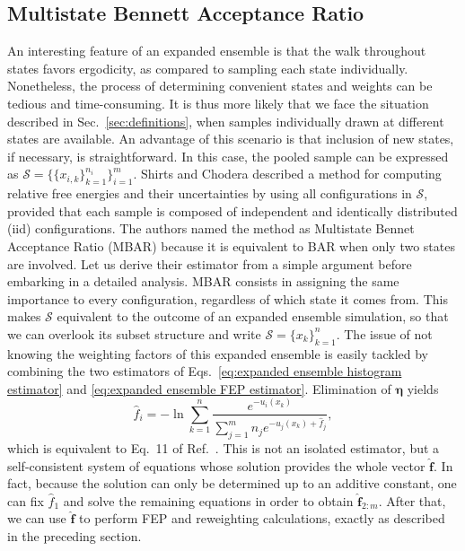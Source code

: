 \documentclass[aip,jcp,reprint,amsmath,amssymb]{revtex4-1}
\newcommand{\vt}[1]{\boldsymbol{\mathbf{#1}}}           %
\begin{document}
\subsection{Multistate Bennett Acceptance Ratio}

An interesting feature of an expanded ensemble is that the walk throughout states favors ergodicity, as compared to sampling each state individually. Nonetheless, the process of determining convenient states and weights can be tedious and time-consuming. It is thus more likely that we face the situation described in Sec.~\ref{sec:definitions}, when samples individually drawn at different states are available. An advantage of this scenario is that inclusion of new states, if necessary, is straightforward. In this case, the pooled sample can be expressed as $\mathcal S = \big\{\{x_{i,k}\}_{k=1}^{n_i} \big\}_{i=1}^m$. Shirts and Chodera\cite{Shirts_2008} described a method for computing relative free energies and their uncertainties by using all configurations in $\mathcal S$, provided that each sample is composed of independent and identically distributed (iid) configurations. The authors named the method as Multistate Bennet Acceptance Ratio (MBAR) because it is equivalent to BAR when only two states are involved. Let us derive their estimator from a simple argument before embarking in a detailed analysis. MBAR consists in assigning the same importance to every configuration, regardless of which state it comes from. This makes $\mathcal S$ equivalent to the outcome of an expanded ensemble simulation, so that we can overlook its subset structure and write $\mathcal S = \{x_k\}_{k=1}^n$. The issue of not knowing the weighting factors of this expanded ensemble is easily tackled by combining the two estimators of Eqs.~\eqref{eq:expanded ensemble histogram estimator} and \eqref{eq:expanded ensemble FEP estimator}. Elimination of $\vt \eta$ yields
\begin{equation}
\label{eq:mbar free energy estimator}
\hat f_i = -\ln \sum_{k=1}^n \frac{e^{-u_i(x_k)}}{\sum_{j=1}^m n_j e^{-u_j(x_k) + \hat f_j}},
\end{equation}
which is equivalent to Eq.~11 of Ref.~. This is not an isolated estimator, but a self-consistent system of equations whose solution provides the whole vector $\hat {\vt f}$. In fact, because the solution can only be determined up to an additive constant, one can fix $\hat f_1$ and solve the remaining equations in order to obtain $\hat{\vt f}_{2:m}$. After that, we can use $\hat{\vt f}$ to perform FEP and reweighting calculations, exactly as described in the preceding section.
\end{document}
